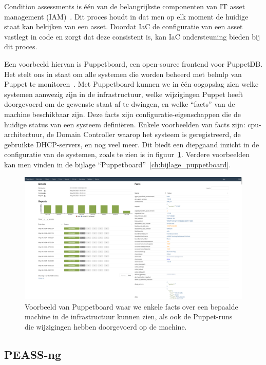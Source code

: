 Condition assessments is \'e\'en van de belangrijkste componenten van IT asset management (IAM)~\autocite{ibm-what-is-iam}.
Dit proces houdt in dat men op elk moment de huidige staat kan bekijken van een asset.
Doordat IaC de configuratie van een asset vastlegt in code en zorgt dat deze consistent is, kan IaC ondersteuning bieden bij dit proces.

Een voorbeeld hiervan is Puppetboard, een open-source frontend voor PuppetDB.
Het stelt ons in staat om alle systemen die worden beheerd met behulp van Puppet te monitoren~\autocite{puppetboard-github}.
Met Puppetboard kunnen we in \'e\'en oogopslag zien welke systemen aanwezig zijn in de infrastructuur, welke wijzigingen Puppet heeft doorgevoerd om de gewenste staat af te dwingen, en welke ``facts'' van de machine beschikbaar zijn.
Deze facts zijn configuratie-eigenschappen die de huidige status van een systeem defini\"eren.
Enkele voorbeelden van facts zijn: cpu-architectuur, de Domain Controller waarop het systeem is geregistreerd, de gebruikte DHCP-servers, en nog veel meer.
Dit biedt een diepgaand inzicht in de configuratie van de systemen, zoals te zien is in figuur~\ref{fig:puppetboard-host-details}.
Verdere voorbeelden kan men vinden in de bijlage ``Puppetboard''~\ref{ch:bijlage_puppetboard}.

\begin{figure}[h!]
    \includegraphics[width=\textwidth]
    {./graphics/state-of-the-art/puppetboard/puppetboard-host-details.png}
    \caption{\label{fig:puppetboard-host-details}Voorbeeld van Puppetboard waar we enkele facts over een bepaalde machine in de infrastructuur kunnen zien, als ook de Puppet-runs die wijzigingen hebben doorgevoerd op de machine.}
\end{figure}

\subsection{PEASS-ng}
\label{sub:peass-ng}

